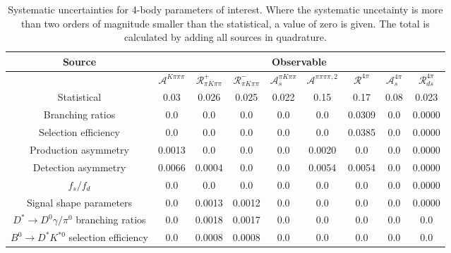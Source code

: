 \begin{sidewaystable}
  \centering
  \begin{tabular}{ccccccccc}
      \toprule
      Source & \multicolumn{8}{c}{Observable} \\
      \midrule
       & $\mathcal{A}^{K\pi\pi\pi}$ & $\mathcal{R}_{\pi K\pi\pi}^+$ & $\mathcal{R}_{\pi K\pi\pi}^-$ & $\mathcal{A}_s^{\pi K\pi\pi}$ & $\mathcal{A}^{\pi\pi\pi\pi,2}$ & $\mathcal{R}^{4\pi}$ & $\mathcal{A}_s^{4\pi}$ & $\mathcal{R}_{ds}^{4\pi}$ \\
      \midrule
      Statistical & 0.03 & 0.026 & 0.025 & 0.022 & 0.15 & 0.17 & 0.08 & 0.023 \\
      \midrule
      Branching ratios & 0.0  & 0.0  & 0.0  & 0.0  & 0.0  & 0.0309 & 0.0  & 0.0000 \\
      Selection efficiency & 0.0  & 0.0  & 0.0  & 0.0  & 0.0  & 0.0385 & 0.0  & 0.0000 \\
      Production asymmetry & 0.0013 & 0.0  & 0.0  & 0.0  & 0.0020 & 0.0  & 0.0  & 0.0000 \\
      Detection asymmetry & 0.0066 & 0.0004 & 0.0  & 0.0  & 0.0054 & 0.0054 & 0.0  & 0.0000 \\
      $f_s/f_d$ & 0.0  & 0.0  & 0.0  & 0.0  & 0.0  & 0.0  & 0.0  & 0.0000 \\
      Signal shape parameters & 0.0  & 0.0013 & 0.0012 & 0.0  & 0.0  & 0.0  & 0.0  & 0.0000 \\
      $D^* \to D^0 \gamma/\pi^0$ branching ratios & 0.0  & 0.0018 & 0.0017 & 0.0  & 0.0  & 0.0  & 0.0  & 0.0  \\
      $B^0 \to D^* K^{*0}$ selection efficiency & 0.0  & 0.0008 & 0.0008 & 0.0  & 0.0  & 0.0  & 0.0  & 0.0  \\
      \bottomrule
  \end{tabular}
  \caption{Systematic uncertainties for 4-body parameters of interest. Where the systematic uncetainty is more than two orders of magnitude smaller than the statistical, a value of zero is given. The total is calculated by adding all sources in quadrature.}
\label{tab:fourBody_systematics}
\end{sidewaystable}
